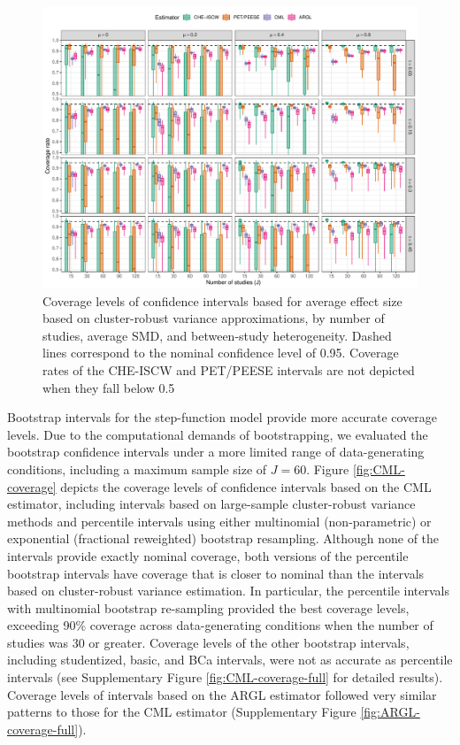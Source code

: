 \documentclass[
  man, donotrepeattitle,floatsintext]{apa7}
\begin{document}
\begin{figure}
\includegraphics{selection_models_draft_files/figure-latex/comparison-coverage-1} \caption{Coverage levels of confidence intervals based for average effect size based on cluster-robust variance approximations, by number of studies, average SMD, and between-study heterogeneity. Dashed lines correspond to the nominal confidence level of 0.95. Coverage rates of the CHE-ISCW and PET/PEESE intervals are not depicted when they fall below 0.5}\label{fig:comparison-coverage}
\end{figure}

Bootstrap intervals for the step-function model provide more accurate coverage levels.
Due to the computational demands of bootstrapping, we evaluated the bootstrap confidence intervals under a more limited range of data-generating conditions, including a maximum sample size of \(J = 60\). Figure \ref{fig:CML-coverage} depicts the coverage levels of confidence intervals based on the CML estimator, including intervals based on large-sample cluster-robust variance methods and percentile intervals using either multinomial (non-parametric) or exponential (fractional reweighted) bootstrap resampling.
Although none of the intervals provide exactly nominal coverage, both versions of the percentile bootstrap intervals have coverage that is closer to nominal than the intervals based on cluster-robust variance estimation.
In particular, the percentile intervals with multinomial bootstrap re-sampling provided the best coverage levels, exceeding 90\% coverage across data-generating conditions when the number of studies was 30 or greater.
Coverage levels of the other bootstrap intervals, including studentized, basic, and BCa intervals, were not as accurate as percentile intervals (see Supplementary Figure \ref{fig:CML-coverage-full} for detailed results).
Coverage levels of intervals based on the ARGL estimator followed very similar patterns to those for the CML estimator (Supplementary Figure \ref{fig:ARGL-coverage-full}).
\end{document}
